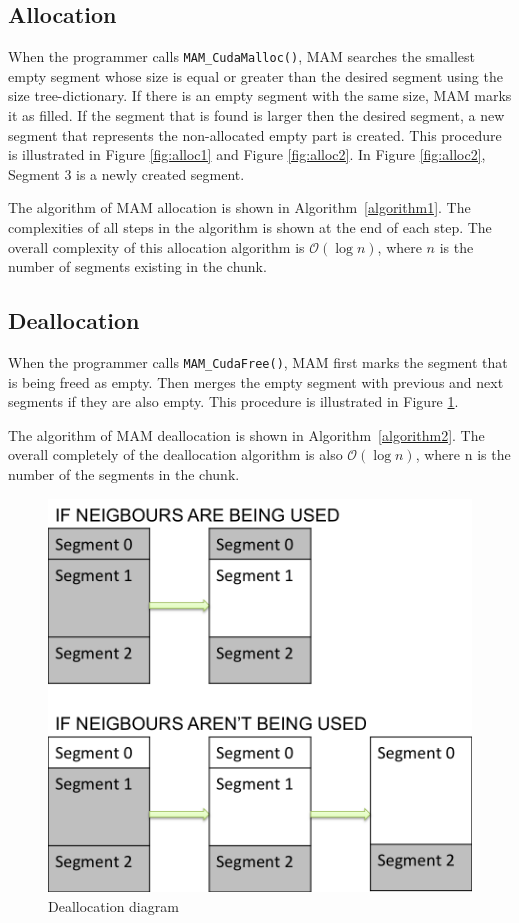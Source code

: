 \documentclass[conference]{IEEEtran}
\def\code#1{\texttt{#1}}
\begin{document}
\subsection{Allocation}
When the programmer calls \code{MAM\_CudaMalloc()}, MAM searches the smallest empty segment whose size is equal or greater than the desired segment using the size tree-dictionary. If there is an empty segment with the same size, MAM marks it as filled. If the segment that is found is larger then the desired segment, a new segment that represents the non-allocated empty part is created. This procedure is illustrated in Figure \ref{fig:alloc1} and Figure \ref{fig:alloc2}. In Figure \ref{fig:alloc2}, Segment 3 is a newly created segment. 




The algorithm of MAM allocation is shown in Algorithm~\ref{algorithm1}. 
The complexities of all steps in the algorithm is shown at the end of each step. The overall complexity of this allocation algorithm is $\mathcal{O}(\log n)$, where $n$ is the number of segments existing in the chunk. 

          





\subsection{Deallocation}
When the programmer calls \code{MAM\_CudaFree()}, MAM first marks the segment that is being freed as empty. Then merges the empty segment with previous and next segments if they are also empty. This procedure is illustrated in Figure \ref{fig:dealloc}. %

The algorithm of MAM deallocation is shown in Algorithm~\ref{algorithm2}. The overall completely of the deallocation algorithm is also $\mathcal{O}(\log n)$, where n is the number of the segments in the chunk. 


\begin{figure}[h!]
\centering
  \includegraphics[width=0.75\linewidth]{deallocation/deallocation.png}
  \caption{Deallocation diagram}
  \label{fig:dealloc}
\end{figure}
\end{document}
